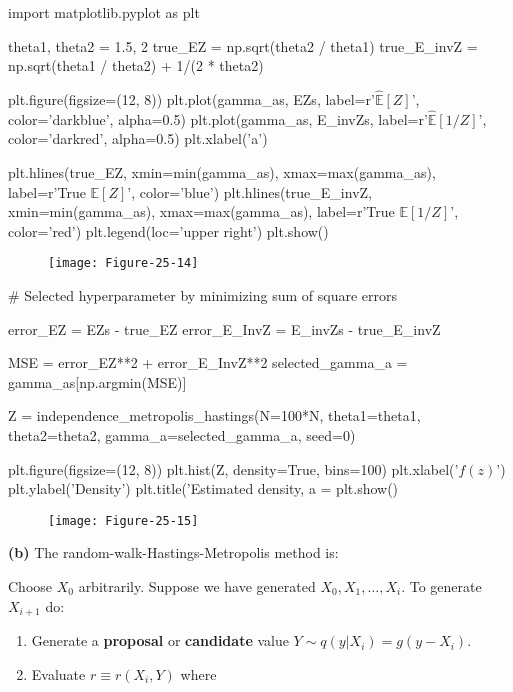 \begin{python}
import matplotlib.pyplot as plt

theta1, theta2 = 1.5, 2
true_EZ = np.sqrt(theta2 / theta1)
true_E_{i}nvZ = np.sqrt(theta1 / theta2) + 1/(2 * theta2)

plt.figure(figsize=(12, 8))
plt.plot(gamma_as, EZs, label=r'$\hat{\mathbb{E}}[Z]$', color='darkblue', alpha=0.5)
plt.plot(gamma_as, E_{i}nvZs, label=r'$\hat{\mathbb{E}}[1 / Z]$', color='darkred', alpha=0.5)
plt.xlabel('a')

plt.hlines(true_EZ, xmin=min(gamma_as), xmax=max(gamma_as), label=r'True $\mathbb{E}[Z]$', color='blue')
plt.hlines(true_E_{i}nvZ, xmin=min(gamma_as), xmax=max(gamma_as), label=r'True $\mathbb{E}[1 / Z]$', color='red')
plt.legend(loc='upper right')
plt.show()
\end{python}

\begin{figure}[H]
\centering
\texttt{[image: Figure-25-14]}
\end{figure}

\begin{python}
# Selected hyperparameter by minimizing sum of square errors

error_EZ = EZs - true_EZ
error_E_InvZ = E_{i}nvZs - true_E_{i}nvZ

MSE = error_EZ**2 + error_E_InvZ**2
selected_gamma_a = gamma_as[np.argmin(MSE)]

Z = independence_metropolis_hastings(N=100*N, theta1=theta1, theta2=theta2, gamma_a=selected_gamma_a, seed=0)
\end{python}

\begin{python}
plt.figure(figsize=(12, 8))
plt.hist(Z, density=True, bins=100)
plt.xlabel('$f(z)$')
plt.ylabel('Density')
plt.title('Estimated density, a = %
plt.show()
\end{python}

\begin{figure}[H]
\centering
\texttt{[image: Figure-25-15]}
\end{figure}

\textbf{(b)} The random-walk-Hastings-Metropolis method is:

Choose \(X_{0}\) arbitrarily. Suppose we have generated
\(X_{0}, X_{1}, \dots, X_{i}\). To generate \(X_{i+1}\) do:

\begin{enumerate}[tightlist,label={\arabic*.}]
\item
  Generate a \textbf{proposal} or \textbf{candidate} value
  \(Y \sim q(y | X_{i}) = g(y - X_{i})\).
\item
  Evaluate \(r \equiv r(X_{i}, Y)\) where
\end{enumerate}

